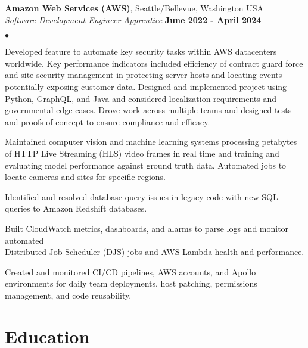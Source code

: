 \documentclass[margin,line]{res}
\newenvironment{list2}{
  \begin{list}{$\bullet$}{%
      \setlength{\itemsep}{0in}
      \setlength{\parsep}{0in} \setlength{\parskip}{0in}
      \setlength{\topsep}{0in} \setlength{\partopsep}{0in} 
      \setlength{\leftmargin}{0.2in}}}{\end{list}}
\begin{document}
\begin{resume}
{\bf Amazon Web Services (AWS)}, Seattle/Bellevue, Washington USA \\
{\em Software Development Engineer Apprentice} \hfill {\bf June 2022 - April 2024} \\
\begin{list2}
\item Developed feature to automate key security tasks within AWS datacenters worldwide. Key performance indicators included efficiency of contract guard force and site security management in protecting server hosts and locating events potentially exposing customer data. Designed and implemented project using Python, GraphQL, and Java and considered localization requirements and governmental edge cases. Drove work across multiple teams and designed tests and proofs of concept to ensure compliance and efficacy.
\item Maintained computer vision and machine learning systems processing petabytes of HTTP Live Streaming (HLS) video frames in real time and training and evaluating model performance against ground truth data. Automated jobs to locate cameras and sites for specific regions.
\item Identified and resolved database query issues in legacy code with new SQL queries to Amazon Redshift databases.
\item Built CloudWatch metrics, dashboards, and alarms to parse logs and monitor automated \\ Distributed Job Scheduler (DJS) jobs and AWS Lambda health and performance.
\item Created and monitored CI/CD pipelines, AWS accounts, and Apollo environments for daily team deployments, host patching, permissions management, and code reusability.
\end{list2}


%
%
\section{\sc Education}


\end{resume}
\end{document}
